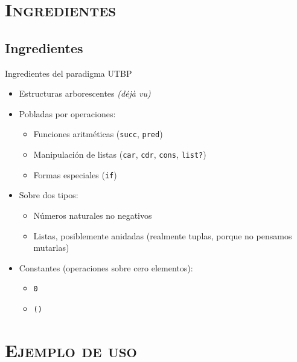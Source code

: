 \documentclass[xcolor=x11names,compress]{beamer}
\renewcommand{\(}{\begin{columns}}
\renewcommand{\)}{\end{columns}}
\newcommand{\<}[1]{\begin{column}{#1}}
\renewcommand{\>}{\end{column}}
\begin{document}
\section{\scshape Ingredientes}
\subsection{Ingredientes}
\begin{frame}{Ingredientes del paradigma UTBP}
    \begin{itemize}
        \item Estructuras arborescentes \pause \emph{(déjà vu)} \pause 
        \item Pobladas por operaciones: \pause
            \begin{itemize}
                \item Funciones aritméticas (\texttt{succ}, \texttt{pred}) \pause
                \item Manipulación de listas (\texttt{car}, \texttt{cdr}, \texttt{cons}, \texttt{list?}) \pause
                \item Formas especiales (\texttt{if}) \pause
            \end{itemize}
        \item Sobre dos tipos: \pause
            \begin{itemize}
            \item Números naturales no negativos \pause
            \item Listas, posiblemente anidadas (realmente tuplas, porque no pensamos mutarlas)\pause
            \end{itemize}
        \item Constantes (operaciones sobre cero elementos): \pause
            \begin{itemize}
                \item \texttt{0} \pause
                \item \texttt{()}
            \end{itemize}
    \end{itemize}
\end{frame}

\section{\scshape Ejemplo de uso}
\end{document}
